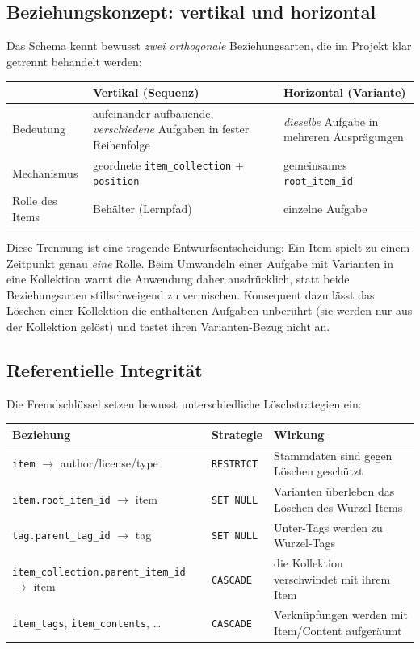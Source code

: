 \documentclass[11pt,a4paper]{article}
\begin{document}
\subsection{Beziehungskonzept: vertikal und horizontal}\label{sec:beziehungen}
Das Schema kennt bewusst \emph{zwei orthogonale} Beziehungsarten, die im Projekt
klar getrennt behandelt werden:

\begin{center}
\begin{tabularx}{\linewidth}{@{}l l Y@{}}
\toprule
 & \textbf{Vertikal (Sequenz)} & \textbf{Horizontal (Variante)} \\
\midrule
Bedeutung & aufeinander aufbauende, \emph{verschiedene} Aufgaben in fester
Reihenfolge & \emph{dieselbe} Aufgabe in mehreren Ausprägungen \\
Mechanismus & geordnete \texttt{item\_collection} + \texttt{position} &
gemeinsames \texttt{root\_item\_id} \\
Rolle des Items & Behälter (Lernpfad) & einzelne Aufgabe \\
\bottomrule
\end{tabularx}
\end{center}

Diese Trennung ist eine tragende Entwurfsentscheidung: Ein Item spielt zu einem
Zeitpunkt genau \emph{eine} Rolle. Beim Umwandeln einer Aufgabe mit Varianten in
eine Kollektion warnt die Anwendung daher ausdrücklich, statt beide
Beziehungsarten stillschweigend zu vermischen. Konsequent dazu lässt das Löschen
einer Kollektion die enthaltenen Aufgaben unberührt (sie werden nur aus der
Kollektion gelöst) und tastet ihren Varianten-Bezug nicht an.

\subsection{Referentielle Integrität}
Die Fremdschlüssel setzen bewusst unterschiedliche Löschstrategien ein:

\begin{center}
\begin{tabularx}{\linewidth}{@{}l l Y@{}}
\toprule
\textbf{Beziehung} & \textbf{Strategie} & \textbf{Wirkung} \\
\midrule
\texttt{item} $\rightarrow$ author/license/type & \texttt{RESTRICT} &
Stammdaten sind gegen Löschen geschützt \\
\texttt{item.root\_item\_id} $\rightarrow$ item & \texttt{SET NULL} & Varianten
überleben das Löschen des Wurzel-Items \\
\texttt{tag.parent\_tag\_id} $\rightarrow$ tag & \texttt{SET NULL} & Unter-Tags
werden zu Wurzel-Tags \\
\texttt{item\_collection.parent\_item\_id} $\rightarrow$ item & \texttt{CASCADE}
& die Kollektion verschwindet mit ihrem Item \\
\texttt{item\_tags}, \texttt{item\_contents}, \ldots & \texttt{CASCADE} &
Verknüpfungen werden mit Item/Content aufgeräumt \\
\bottomrule
\end{tabularx}
\end{center}
\end{document}
